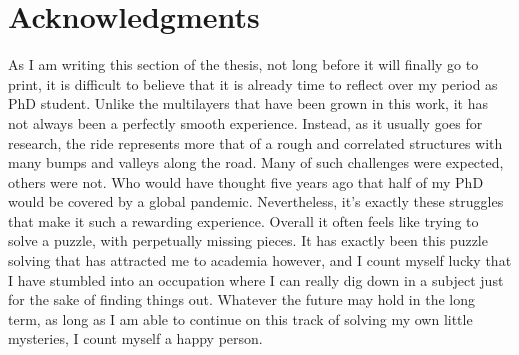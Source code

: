 \chapter{Acknowledgments}

As I am writing this section of the thesis, not long before it will finally go to print, it is difficult to believe that it is already time to reflect over my period as PhD student. Unlike the multilayers that have been grown in this work, it has not always been a perfectly smooth experience. Instead, as it usually goes for research, the ride represents more that of a rough and correlated structures with many bumps and valleys along the road. Many of such challenges were expected, others were not. Who would have thought five years ago that half of my PhD would be covered by a global pandemic. Nevertheless, it's exactly these struggles that make it such a rewarding experience. Overall it often feels like trying to solve a puzzle, with perpetually missing pieces. It has exactly been this puzzle solving that has attracted me to academia however, and I count myself lucky that I have stumbled into an occupation where I can really dig down in a subject just for the sake of finding things out. Whatever the future may hold in the long term, as long as I am able to continue on this track of solving my own little mysteries, I count myself a happy person.
\\
\\
